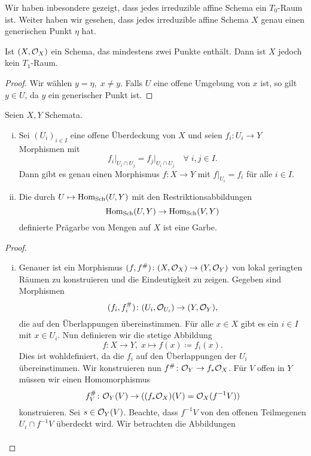 \begin{bem*}
	Wir haben inbesondere gezeigt, dass jedes irreduzible affine Schema ein $T_0$-Raum ist. Weiter haben wir gesehen, dass jedes irreduzible affine Schema $X$ genau einen generischen Punkt $\eta$ hat.

	Ist $(X,\mathcal{O}_X)$ ein Schema, das mindestens zwei Punkte enthält. Dann ist $X$ jedoch kein $T_1$-Raum.
	\begin{proof}
		Wir wählen $y = \eta,\; x \neq y$. Falls $U$ eine offene Umgebung von $x$ ist, so gilt $y \in U$, da $y$ ein generischer Punkt ist.		
	\end{proof}
\end{bem*}

\begin{lem}
\label{lem:5.5}
	Seien $X,Y$ Schemata.
	\begin{enumerate}[i)]
		\item Sei $(U_i)_{i\in I}$ eine offene Überdeckung von $X$ und seien $f_i\colon U_i\to Y$ Morphismen mit
		\[
			f_i\vert_{U_i\cap U_j} = f_j\vert_{U_i\cap U_j} \quad \forall\; i,j \in I.
		\]
		Dann gibt es genau einen Morphismus $f \colon X \to Y$ mit $f\vert_{U_i} = f_i$ für alle $i \in I$.
		\item Die durch $U \mapsto \operatorname{Hom}_{\operatorname{Sch}}(U,Y)$ mit den Restriktionsabbildungen
		\[
			\operatorname{Hom}_{\operatorname{Sch}}(U,Y) \to \operatorname{Hom}_{\operatorname{Sch}}(V,Y)
		\]
		definierte Prägarbe von Mengen auf $X$ ist eine Garbe.
	\end{enumerate}
	\begin{proof}
		\begin{enumerate}[i)]
			\item Genauer ist ein Morphismus $(f,f^{\#})\colon (X,\mathcal{O}_X) \to (Y,\mathcal{O}_Y)$ von lokal geringten Räumen zu konstruieren und die Eindeutigkeit zu zeigen. Gegeben sind Morphismen
			\[
				(f_i,f_i^{\#})\colon (U_i,\mathcal{O}_{U_i}) \to (Y,\mathcal{O}_Y),
			\]
			die auf den Überlappungen übereinstimmen. Für alle $x \in X$ gibt es ein $i \in I$ mit $x \in U_i$. Nun definieren wir die stetige Abbildung
			\[
				f\colon X \to Y,\; x \mapsto f(x) \coloneqq f_i(x).
			\]
			Dies ist wohldefiniert, da die $f_i$ auf den Überlappungen der $U_i$ übereinstimmen. Wir konstruieren nun $f^{\#}\colon \mathcal{O}_Y \to f_*\mathcal{O}_X$. Für $V$ offen in $Y$ müssen wir einen Homomorphismus
			\[
				f^{\#}_V\colon \mathcal{O}_Y(V) \to ((f_*\mathcal{O}_X)(V) = \mathcal{O}_X(f^{-1}V))
			\]
			konstruieren. Sei $s \in \mathcal{O}_Y(V)$. Beachte, dass $f^{-1}V$ von den offenen Teilmegenen $U_i \cap f^{-1}V$ überdeckt wird. Wir betrachten die Abbildungen
			\begin{align*}

\end{align*}
\end{enumerate}
\end{proof}
\end{lem}
